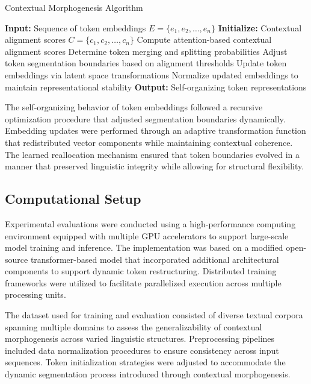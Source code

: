 \documentclass{article}
\begin{document}
\begin{algorithm}
	\caption{Contextual Morphogenesis Algorithm}
	\begin{algorithmic}[1]
		\State \textbf{Input:} Sequence of token embeddings $E = \{e_1, e_2, \dots, e_n\}$
		\State \textbf{Initialize:} Contextual alignment scores $C = \{c_1, c_2, \dots, c_n\}$ 
		\State Compute attention-based contextual alignment scores
		\State Determine token merging and splitting probabilities
		\State Adjust token segmentation boundaries based on alignment thresholds
		\State Update token embeddings via latent space transformations
		\State Normalize updated embeddings to maintain representational stability
		\EndFor
		\State \textbf{Output:} Self-organizing token representations
	\end{algorithmic}
\end{algorithm}

The self-organizing behavior of token embeddings followed a recursive optimization procedure that adjusted segmentation boundaries dynamically. Embedding updates were performed through an adaptive transformation function that redistributed vector components while maintaining contextual coherence. The learned reallocation mechanism ensured that token boundaries evolved in a manner that preserved linguistic integrity while allowing for structural flexibility. 

\subsection{Computational Setup}

Experimental evaluations were conducted using a high-performance computing environment equipped with multiple GPU accelerators to support large-scale model training and inference. The implementation was based on a modified open-source transformer-based model that incorporated additional architectural components to support dynamic token restructuring. Distributed training frameworks were utilized to facilitate parallelized execution across multiple processing units. 

The dataset used for training and evaluation consisted of diverse textual corpora spanning multiple domains to assess the generalizability of contextual morphogenesis across varied linguistic structures. Preprocessing pipelines included data normalization procedures to ensure consistency across input sequences. Token initialization strategies were adjusted to accommodate the dynamic segmentation process introduced through contextual morphogenesis. 
\end{document}
